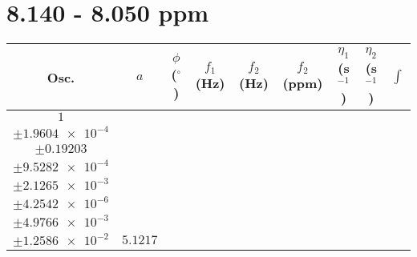 \documentclass[8pt]{article}
\begin{document}
\section*{8.140 - 8.050 ppm}
\begin{longtable}[l]{c c c c c c c c c}
\toprule
Osc. & $a$ & $\phi$ ($^{\circ}$) & $f_1$ (Hz) & $f_2$ (Hz) & $f_2$ (ppm) & $\eta_1$ (s$^{-1}$) & $\eta_2$ (s$^{-1}$) & $\int$\\
\midrule
$\num{1}$ & \begin{tabular}[c]{@{}c@{}}$\num{6.512e-2}$ \\ $\pm\num{1.9604e-4}$\end{tabular} & \begin{tabular}[c]{@{}c@{}}$\num{0.87163}$ \\ $\pm\num{0.19203}$\end{tabular} & \begin{tabular}[c]{@{}c@{}}$\num{-4.451}$ \\ $\pm\num{9.5282e-4}$\end{tabular} & \begin{tabular}[c]{@{}c@{}}$\num{4.0406e+3}$ \\ $\pm\num{2.1265e-3}$\end{tabular} & \begin{tabular}[c]{@{}c@{}}$\num{8.0834}$ \\ $\pm\num{4.2542e-6}$\end{tabular} & \begin{tabular}[c]{@{}c@{}}$\num{1.6953}$ \\ $\pm\num{4.9766e-3}$\end{tabular} & \begin{tabular}[c]{@{}c@{}}$\num{4.5554}$ \\ $\pm\num{1.2586e-2}$\end{tabular} & $\num{5.1217}$\\

\end{longtable}
\end{document}
